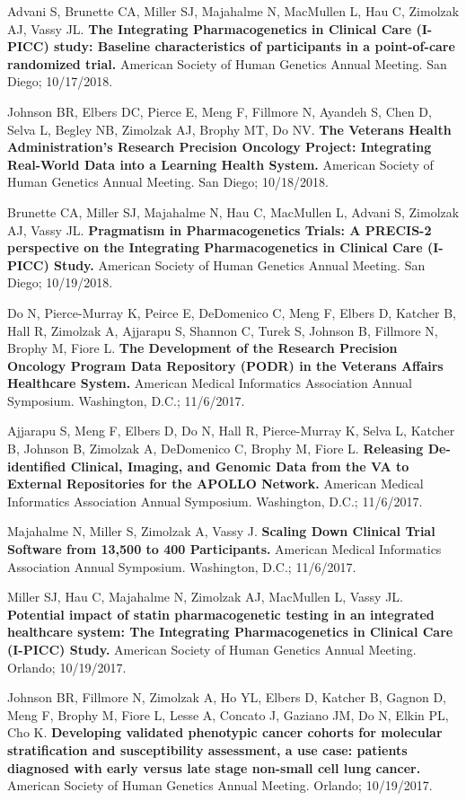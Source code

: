 \documentclass[10pt]{article}
\begin{document}
Advani S, Brunette CA, Miller SJ, Majahalme N, MacMullen L, Hau C,
Zimolzak AJ, Vassy JL. \textbf{The Integrating Pharmacogenetics in
  Clinical Care (I-PICC) study: Baseline characteristics of
  participants in a point-of-care randomized trial.} American Society
of Human Genetics Annual Meeting. San Diego; 10/17/2018.

Johnson BR, Elbers DC, Pierce E, Meng F, Fillmore N, Ayandeh S, Chen
D, Selva L, Begley NB, Zimolzak AJ, Brophy MT, Do NV. \textbf{The
  Veterans Health Administration's Research Precision Oncology
  Project: Integrating Real-World Data into a Learning Health System.}
American Society of Human Genetics Annual Meeting. San Diego;
10/18/2018.

Brunette CA, Miller SJ, Majahalme N, Hau C, MacMullen L, Advani S,
Zimolzak AJ, Vassy JL. \textbf{Pragmatism in Pharmacogenetics Trials:
  A PRECIS-2 perspective on the Integrating Pharmacogenetics in
  Clinical Care (I-PICC) Study.} American Society of Human Genetics
Annual Meeting. San Diego; 10/19/2018.

Do N, Pierce-Murray K, Peirce E, DeDomenico C, Meng F, Elbers D,
Katcher B, Hall R, Zimolzak A, Ajjarapu S, Shannon C, Turek S, Johnson
B, Fillmore N, Brophy M, Fiore L. \textbf{The Development of the
  Research Precision Oncology Program Data Repository (PODR) in the
  Veterans Affairs Healthcare System.} American Medical Informatics
Association Annual Symposium. Washington, D.C.; 11/6/2017.

Ajjarapu S, Meng F, Elbers D, Do N, Hall R, Pierce-Murray K, Selva L,
Katcher B, Johnson B, Zimolzak A, DeDomenico C, Brophy M, Fiore L.
\textbf{Releasing De-identified Clinical, Imaging, and Genomic Data
  from the VA to External Repositories for the APOLLO Network.}
American Medical Informatics Association Annual Symposium. Washington,
D.C.; 11/6/2017.

Majahalme N, Miller S, Zimolzak A, Vassy J. \textbf{Scaling Down
  Clinical Trial Software from 13,500 to 400 Participants.} American
Medical Informatics Association Annual Symposium. Washington, D.C.;
11/6/2017.

Miller SJ, Hau C, Majahalme N, Zimolzak AJ, MacMullen L, Vassy JL.
\textbf{Potential impact of statin pharmacogenetic testing in an
  integrated healthcare system: The Integrating Pharmacogenetics in
  Clinical Care (I-PICC) Study.} American Society of Human Genetics
Annual Meeting. Orlando; 10/19/2017.

Johnson BR, Fillmore N, Zimolzak A, Ho YL, Elbers D, Katcher B, Gagnon
D, Meng F, Brophy M, Fiore L, Lesse A, Concato J, Gaziano JM, Do N,
Elkin PL, Cho K. \textbf{Developing validated phenotypic cancer
  cohorts for molecular stratification and susceptibility assessment,
  a use case: patients diagnosed with early versus late stage
  non-small cell lung cancer.} American Society of Human Genetics
Annual Meeting. Orlando; 10/19/2017.
\end{document}
